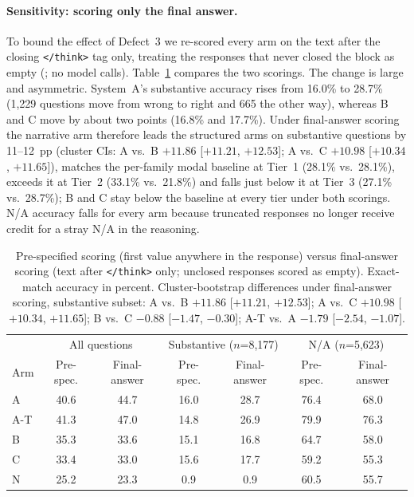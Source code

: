 \paragraph{Sensitivity: scoring only the final answer.}
To bound the effect of Defect~3 we re-scored every arm on the text after the closing
\texttt{</think>} tag only, treating the responses that never closed the block as empty
(; no model calls).  Table~\ref{tab:postthink}
compares the two scorings.  The change is large and asymmetric.  System~A's substantive
accuracy rises from 16.0\% to 28.7\% (1,229 questions move from wrong to right and 665
the other way), whereas B and C move by about two points (16.8\% and 17.7\%).  Under
final-answer scoring the narrative arm therefore leads the structured arms on
substantive questions by 11--12~pp (cluster CIs: A vs.\ B $+11.86$ [$+11.21$, $+12.53$];
A vs.\ C $+10.98$ [$+10.34$, $+11.65$]), matches the per-family modal baseline at
Tier~1 (28.1\% vs.\ 28.1\%), exceeds it at Tier~2 (33.1\% vs.\ 21.8\%) and falls just
below it at Tier~3 (27.1\% vs.\ 28.7\%); B and C stay below the baseline at every tier
under both scorings.  N/A accuracy falls for every arm because truncated responses no
longer receive credit for a stray N/A in the reasoning.

\begin{table}[htbp]
\centering
\small
\caption{Pre-specified scoring (first value anywhere in the response) versus final-answer
scoring (text after \texttt{</think>} only; unclosed responses scored as empty).
Exact-match accuracy in percent.  Cluster-bootstrap differences under final-answer
scoring, substantive subset: A vs.\ B $+11.86$ [$+11.21$, $+12.53$]; A vs.\ C $+10.98$
[$+10.34$, $+11.65$]; B vs.\ C $-0.88$ [$-1.47$, $-0.30$]; A-T vs.\ A $-1.79$
[$-2.54$, $-1.07$].}
\label{tab:postthink}
\begin{tabular}{lcccccc}
\toprule
 & \multicolumn{2}{c}{All questions} & \multicolumn{2}{c}{Substantive ($n$=8,177)} & \multicolumn{2}{c}{N/A ($n$=5,623)} \\
Arm & Pre-spec. & Final-answer & Pre-spec. & Final-answer & Pre-spec. & Final-answer \\
\midrule
A   & 40.6 & 44.7 & 16.0 & 28.7 & 76.4 & 68.0 \\
A-T & 41.3 & 47.0 & 14.8 & 26.9 & 79.9 & 76.3 \\
B   & 35.3 & 33.6 & 15.1 & 16.8 & 64.7 & 58.0 \\
C   & 33.4 & 33.0 & 15.6 & 17.7 & 59.2 & 55.3 \\
N   & 25.2 & 23.3 &  0.9 &  0.9 & 60.5 & 55.7 \\
\bottomrule
\end{tabular}
\end{table}

